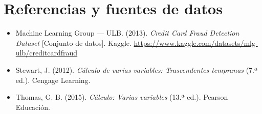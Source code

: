 \documentclass[12pt,a4paper]{article}
\begin{document}
\newpage

\section{Referencias y fuentes de datos}

\begin{itemize}
    \item Machine Learning Group --- ULB. (2013). \textit{Credit Card Fraud Detection Dataset} [Conjunto de datos]. Kaggle. \url{https://www.kaggle.com/datasets/mlg-ulb/creditcardfraud}
    \item Stewart, J. (2012). \textit{Cálculo de varias variables: Trascendentes tempranas} (7.ª ed.). Cengage Learning.
    \item Thomas, G. B. (2015). \textit{Cálculo: Varias variables} (13.ª ed.). Pearson Educación.
\end{itemize}
\end{document}
